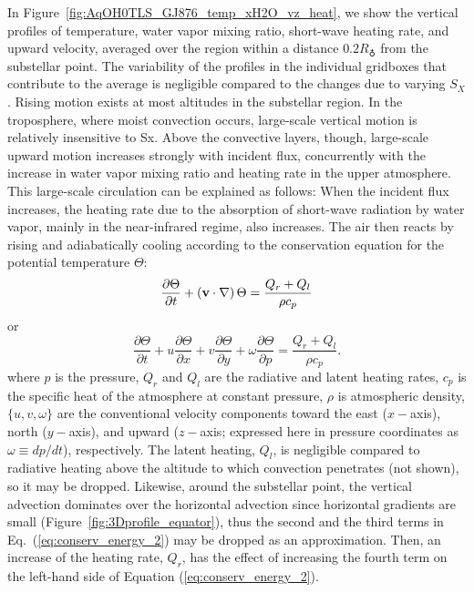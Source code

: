 \documentclass[11pt,numberedappendix,twocolappendix,]{emulateapj}
\def\wv{water vapor}
\begin{document}
In Figure~\ref{fig:AqOH0TLS_GJ876_temp_xH2O_vz_heat}, we show the vertical profiles of temperature, \wv{} mixing ratio, short-wave heating rate, and upward velocity, averaged over the region within a distance $0.2R_\earth$ from the substellar point. 
The variability of the profiles in the individual gridboxes that contribute to the average is negligible compared to the changes due to varying $S_X$. 
%
Rising motion exists at most altitudes in the substellar region.  In the troposphere, where moist convection occurs, large-scale vertical motion is relatively insensitive to Sx.  Above the convective layers, though, large-scale upward motion increases strongly with incident flux, concurrently with the increase in \wv{} mixing ratio and heating rate in the upper atmosphere. 
This large-scale circulation can be explained as follows: When the incident flux increases, the heating rate due to the absorption of short-wave radiation by \wv{}, mainly in the near-infrared regime, also increases. 
The air then reacts by rising and adiabatically cooling according to the conservation equation for the potential temperature $\Theta $:
\begin{equation}
\frac{\partial \Theta }{\partial t} + ( {\bf v} \cdot \nabla ) \, \Theta = \frac{ Q_r + Q_l }{\rho c_p} \label{eq:conserv_energy}
\end{equation}
or
\begin{equation}
\frac{\partial \Theta }{\partial t} + u \frac{\partial \Theta }{\partial x} + v\frac{\partial \Theta }{\partial y} + \omega \frac{\partial \Theta }{\partial p} = \frac{ Q_r + Q_l }{\rho c_p}. \label{eq:conserv_energy_2}
\end{equation}
where $p$ is the pressure, $Q_r$ and $Q_l$ are the radiative and latent heating rates, $c_p$ is the specific heat of the atmosphere at constant pressure, $\rho $ is atmospheric density, $\{ u, v, \omega \}$ are the conventional velocity components toward the east ($x-$axis), north ($y-$axis), and upward ($z-$axis; expressed here in pressure coordinates as $\omega \equiv dp/dt$), respectively. 
The latent heating, $Q_l$, is negligible compared to radiative heating above the altitude to which convection penetrates (not shown), so it may be dropped. 
Likewise, around the substellar point, the vertical advection dominates over the horizontal advection since horizontal gradients are small (Figure~\ref{fig:3Dprofile_equator}), thus the second and the third terms in Eq.~(\ref{eq:conserv_energy_2}) may be dropped as an approximation. 
Then, an increase of the heating rate, $Q_r$, has the effect of increasing the fourth term on the left-hand side of Equation (\ref{eq:conserv_energy_2}). 
\end{document}
